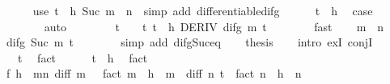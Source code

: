 \begin{isabellebody}
\ \ \ \ \isamarkupfalse%
\ {\isacharparenleft}{\kern0pt}use\ {\isacartoucheopen}t\ {\isacharless}{\kern0pt}\ h{\isacartoucheclose}\ {\isacartoucheopen}Suc\ m{\isacharprime}{\kern0pt}\ {\isacharless}{\kern0pt}\ n{\isacartoucheclose}\ \ {\isacartoucheopen}simp\ add{\isacharcolon}{\kern0pt}\ differentiable{\isacharunderscore}{\kern0pt}difg{\isacartoucheclose}{\isacharparenright}{\kern0pt}\isanewline
\ \ \ \ \isamarkupfalse%
\ {\isacartoucheopen}t\ {\isacharless}{\kern0pt}\ h{\isacartoucheclose}\ \isamarkupfalse%
\ {\isacharquery}{\kern0pt}case\isanewline
\ \ \ \ \ \ \isamarkupfalse%
\ auto\isanewline
\ \ \isamarkupfalse%
\isanewline
\ \ \isamarkupfalse%
\ \isamarkupfalse%
\ t\ \ {\isachardoublequoteopen}{}\ {\isacharless}{\kern0pt}\ t{\isachardoublequoteclose}\ {\isachardoublequoteopen}t\ {\isacharless}{\kern0pt}\ h{\isachardoublequoteclose}\ {\isachardoublequoteopen}DERIV\ {\isacharparenleft}{\kern0pt}difg\ m{\isacharparenright}{\kern0pt}\ t\ {\isacharcolon}{\kern0pt}{\isachargreater}{\kern0pt}\ {}{\isachardoublequoteclose}\isanewline
\ \ \ \ \isamarkupfalse%
\ fast\isanewline
\ \ \isamarkupfalse%
\ {\isacartoucheopen}m\ {\isacharless}{\kern0pt}\ n{\isacartoucheclose}\ \isamarkupfalse%
\ {\isachardoublequoteopen}difg\ {\isacharparenleft}{\kern0pt}Suc\ m{\isacharparenright}{\kern0pt}\ t\ {\isacharequal}{\kern0pt}\ {}{\isachardoublequoteclose}\isanewline
\ \ \ \ \isamarkupfalse%
\ {\isacharparenleft}{\kern0pt}simp\ add{\isacharcolon}{\kern0pt}\ difg{\isacharunderscore}{\kern0pt}Suc{\isacharunderscore}{\kern0pt}eq{\isacharunderscore}{\kern0pt}{}{\isacharparenright}{\kern0pt}\isanewline
\ \ \isamarkupfalse%
\ {\isacharquery}{\kern0pt}thesis\isanewline
\ \ \isamarkupfalse%
\ {\isacharparenleft}{\kern0pt}intro\ exI\ conjI{\isacharparenright}{\kern0pt}\isanewline
\ \ \ \ \isamarkupfalse%
\ {\isachardoublequoteopen}{}\ {\isacharless}{\kern0pt}\ t{\isachardoublequoteclose}\ \isamarkupfalse%
\ fact\isanewline
\ \ \ \ \isamarkupfalse%
\ {\isachardoublequoteopen}t\ {\isacharless}{\kern0pt}\ h{\isachardoublequoteclose}\ \isamarkupfalse%
\ fact\isanewline
\ \ \ \ \isamarkupfalse%
\ {\isachardoublequoteopen}f\ h\ {\isacharequal}{\kern0pt}\ {\isacharparenleft}{\kern0pt}{\isasymSum}m{\isacharless}{\kern0pt}n{\isachardot}{\kern0pt}\ diff\ m\ {}\ {\isacharslash}{\kern0pt}\ {\isacharparenleft}{\kern0pt}fact\ m{\isacharparenright}{\kern0pt}\ {\isacharasterisk}{\kern0pt}\ h\ {\isacharcircum}{\kern0pt}\ m{\isacharparenright}{\kern0pt}\ {\isacharplus}{\kern0pt}\ diff\ n\ t\ {\isacharslash}{\kern0pt}\ {\isacharparenleft}{\kern0pt}fact\ n{\isacharparenright}{\kern0pt}\ {\isacharasterisk}{\kern0pt}\ h\ {\isacharcircum}{\kern0pt}\ n{\isachardoublequoteclose}\isanewline

\end{isabellebody}
